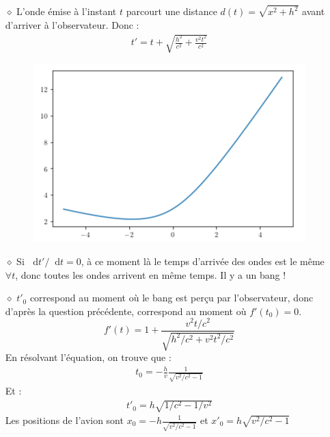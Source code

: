 \documentclass{report}
\newcommand*\dif{\mathop{}\!\mathrm{d}}
\begin{document}
\begin{itemize}
	\item[$\diamond$] L'onde émise à l'instant $t$ parcourt une distance $d(t)=\sqrt{x^2+h^2}$ avant d'arriver à l'observateur. Donc :
	\begin{align*}
		t'=t+\sqrt{\frac{h^2}{c^2}+\frac{v^2t^2}{c^2}}
	\end{align*}

\begin{figure}[h!]
\centering
		\includegraphics[scale=0.5]{onde_choc.png}
\end{figure}	
	
	\item[$\diamond$] Si $\dif t'/\dif t=0$, à ce moment là le temps d'arrivée des ondes est le même $\forall t$, donc toutes les ondes arrivent en même temps. Il y a un bang !
	
	\item[$\diamond$] $t'_0$ correspond au moment où le bang est perçu par l'observateur, donc d'après la question précédente, correspond au moment où $f'(t_0)=0$.
	\begin{equation}
		f'(t)=1+\frac{v^2t/c^2}{\sqrt{h^2/c^2+v^2t^2/c^2}}
	\end{equation}
	En résolvant l'équation, on trouve que :
	\begin{align*}
		t_0=-\frac{h}{v}\frac{1}{\sqrt{v^2/c^2-1}}
	\end{align*}
	Et :
	\begin{align*}
		t'_0=h\sqrt{1/c^2-1/v^2}
	\end{align*}
	Les positions de l'avion sont $x_0=-h\frac{1}{\sqrt{v^2/c^2-1}}$ et $x'_0=h\sqrt{v^2/c^2-1}$
	

\end{itemize}
\end{document}
